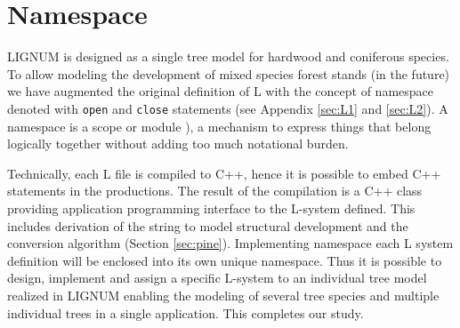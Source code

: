 \section{Namespace}\label{sec:namespace}
LIGNUM is designed as a  single tree model for hardwood and coniferous
species.  To  allow modeling the  development of mixed  species forest
stands (in the future) we  have augmented the original definition of L
with  the   concept  of  namespace  denoted   with  \texttt{open}  and
\texttt{close}    statements    (see    Appendix   \ref{sec:L1}    and
\ref{sec:L2}).     A    namespace     is    a    scope    or    module
\citep{stroustrup:97}),  a  mechanism to  express  things that  belong
logically together without adding too much notational burden.
 
Technically, each L  file is compiled to C++, hence  it is possible to
embed C++ statements in the productions. The result of the compilation
is  a C++  class providing  application programming  interface  to the
L-system  defined. This  includes derivation  of the  string  to model
structural   development  and   the   conversion  algorithm   (Section
\ref{sec:pine}).  Implementing namespace each L system definition will
be  enclosed into its  own unique  namespace. Thus  it is  possible to
design, implement and assign a specific L-system to an individual tree
model realized in LIGNUM enabling the modeling of several tree species
and multiple individual trees  in a single application. This completes
our study.

